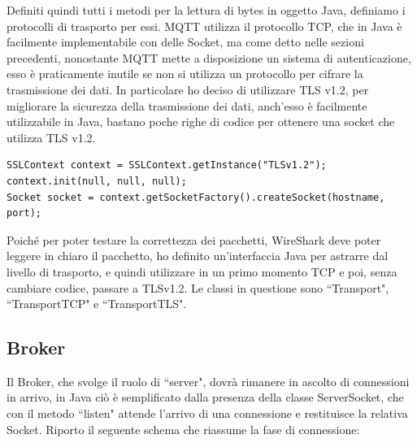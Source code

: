 \documentclass{article}
\begin{document}
Definiti quindi tutti i metodi per la lettura di bytes in oggetto Java, definiamo i protocolli di trasporto per essi. MQTT utilizza il protocollo TCP, che in Java è facilmente implementabile con delle Socket, ma come detto nelle sezioni precedenti, nonostante MQTT mette a disposizione un sistema di autenticazione, esso è praticamente inutile se non si utilizza un protocollo per cifrare la trasmissione dei dati. In particolare ho deciso di utilizzare TLS v1.2, per migliorare la sicurezza della trasmissione dei dati, anch'esso è facilmente utilizzabile in Java, bastano poche righe di codice per ottenere una socket che utilizza TLS v1.2.
\begin{lstlisting}[style=JavaStyle]
SSLContext context = SSLContext.getInstance("TLSv1.2");
context.init(null, null, null);
Socket socket = context.getSocketFactory().createSocket(hostname, port);
\end{lstlisting} 
Poiché per poter testare la correttezza dei pacchetti, WireShark deve poter leggere in chiaro il pacchetto, ho definito un'interfaccia Java per astrarre dal livello di trasporto, e quindi utilizzare in un primo momento TCP e poi, senza cambiare codice, passare a TLSv1.2. Le classi in questione sono ``Transport", ``TransportTCP" e ``TransportTLS".

\subsection{Broker}
Il Broker, che svolge il ruolo di ``server", dovrà rimanere in ascolto di connessioni in arrivo, in Java ciò è semplificato dalla presenza della classe ServerSocket, che con il metodo ``listen" attende l'arrivo di una connessione e restituisce la relativa Socket. Riporto il seguente schema che riassume la fase di connessione:
\end{document}
